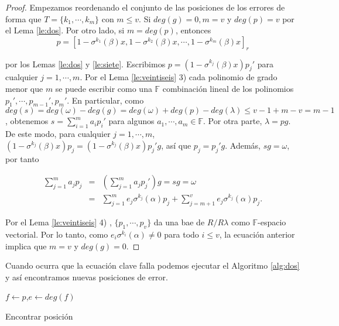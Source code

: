 \begin{proof}
    Empezamos reordenando el conjunto de las posiciones de los errores de forma que $T = \{ k_1,\cdots, k_m \}$ con $m \leq v$. Si $deg(g) = 0, m=v$ y $deg(p) = v$ por el Lema \ref{le:dos}. Por otro lado, si $m = deg(p)$, entonces 
    \[ p = [1-\sigma^{k_1}(\beta)x,1-\sigma^{k_2}(\beta)x,\cdots,1-\sigma^{k_m}(\beta)x ]_r\]

por los Lemas \ref{le:dos} y \ref{le:siete}. Escribimos $p = (1-\sigma^{k_j}(\beta)x)p_j'$ para cualquier $j = 1,\cdots,m$. Por el Lema \ref{le:veintiseis} 3) cada polinomio de grado menor que $m$ se puede escribir como una $\mathbb{F}$ combinación lineal de los polinomios $p_1',\cdots,p_{m-1}',p_m'$. En particular, como $deg(s) = deg(\omega)-deg(g) = deg(\omega)+deg(p)-deg(\lambda) \leq v-1+m-v = m-1$, obtenemos $s = \sum_{i=1}^m a_ip_i'$ para algunos $a_1,\cdots,a_m \in \mathbb{F}$. Por otra parte, $\lambda = pg$. De este modo, para cualquier $j = 1,\cdots,m$,$(1-\sigma^{k_j}(\beta)x)p_j = (1-\sigma^{k_j}(\beta)x)p_j'g$, así que $p_j = p_j'g$. Además, $sg = \omega$, por tanto


\begin{eqnarray*}
     \sum_{j=1}^m a_jp_j & = & (\sum_{j=1}^m a_jp_j')g = sg = \omega \\
     & = & \sum_{j=1}^m e_j\sigma^{k_j}(\alpha)p_j + \sum_{j=m+1}^v e_j\sigma^{k_j}(\alpha)p_j .
\end{eqnarray*}

Por el Lema \ref{le:veintiseis} 4) , $\{p_1,\cdots,p_v \}$ da una bae de $R/R\lambda$ como $\mathbb{F}$-espacio vectorial. Por lo tanto, como $e_i\sigma^{k_i}(\alpha) \neq 0 $ para todo $i \leq v$, la ecuación anterior implica que $m=v$ y $deg(g) = 0$. 
\end{proof}

Cuando ocurra que la ecuación clave falla podemos ejecutar el Algoritmo \ref{alg:dos} y así encontramos nuevas posiciones de error.

\begin{algorithm}
    \SetAlgoNoLine


    \BlankLine

    $f \gets p$,$e \gets deg(f)$
    

    \caption{Encontrar posición}
    \label{alg:dos}
\end{algorithm}


